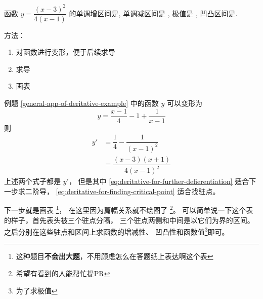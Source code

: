 \begin{example} \label{general-app-of-deritative-example}
    函数 $y = \dfrac{(x-3)^2}{4(x-1)}$ 的单调增区间是\underline{\quad\quad}, 
    单调减区间是 \underline{\quad\quad}, 极值是 \underline{\quad\quad}, 凹凸区间是\underline{\quad\quad}.

    \begin{center}
    \raisebox{0.5ex}{\rule{\textwidth}{0.3pt}}
    \end{center}

    方法：
    \begin{enumerate}
        \item 对函数进行变形，便于后续求导
        \item 求导
        \item 画表
    \end{enumerate}
    \cite[page 21, question 43]{w660ans}
\end{example}
例题 \ref{general-app-of-deritative-example}
中的函数 $y$ 可以变形为
\[
    y = \dfrac{x-1}{4} - 1 + \dfrac{1}{x-1}
\]
则
\begin{align}
    y' &= \dfrac{1}{4} - \dfrac{1}{(x-1)^2} \label{eq:deritative-for-further-defierentiation}\\
       &= \dfrac{(x-3)(x+1)}{4(x-1)^2}      \label{eq:deritative-for-finding-critical-point}
\end{align}
上述两个式子都是 $y'$， 但是其中 \ref{eq:deritative-for-further-defierentiation} 适合下一步求二阶导，
\ref{eq:deritative-for-finding-critical-point} 适合找驻点。

下一步就是画表
\footnote{这种题目\textbf{不会出大题}，不用顾虑怎么在答题纸上表达啊这个表}，
在这里因为篇幅关系就不绘图了
\footnote{希望有看到的人能帮忙提PR}。
可以简单说一下这个表的样子，首先表头被三个驻点分隔，
三个驻点两侧和中间是以它们为界的区间。
之后分别在这些驻点和区间上求函数的增减性、
凹凸性和函数值\footnote{为了求极值}即可。



